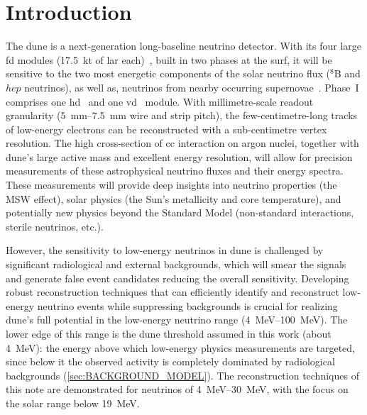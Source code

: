 \section{Introduction} \label{sec:INTRODUCTION}
The \gls{dune} is a next-generation long-baseline neutrino detector. With its four large \gls{fd} modules (\SI{17.5}{\kilo\tonne} of \gls{lar} each)~\cite{abi2018dune,DUNE:2020lwj}, built in two phases at the \gls{surf}, it will be sensitive to the two most energetic components of the solar neutrino flux ($^{8}\text{B}$ and $hep$ neutrinos), as well as, neutrinos from nearby occurring supernovae~\cite{DUNE:2020zfm}. Phase~I comprises one \gls{hd}~\cite{DUNE:2020txw} and one \gls{vd}~\cite{DUNE:2023nqi} module. With millimetre-scale readout granularity (\SIrange{5}{7.5}{\milli\meter} wire and strip pitch), the few-centimetre-long tracks of low-energy electrons can be reconstructed with a sub-centimetre vertex resolution. The high cross-section of \gls{cc} interaction on argon nuclei, together with \gls{dune}'s large active mass and excellent energy resolution, will allow for precision measurements of these astrophysical neutrino fluxes and their energy spectra. These measurements will provide deep insights into neutrino properties (the MSW effect), solar physics (the Sun's metallicity and core temperature), and potentially new physics beyond the Standard Model (non-standard interactions, sterile neutrinos, etc.).

However, the sensitivity to low-energy neutrinos in \gls{dune} is challenged by significant radiological and external backgrounds, which will smear the signals and generate false event candidates reducing the overall sensitivity. Developing robust reconstruction techniques that can efficiently identify and reconstruct low-energy neutrino events while suppressing backgrounds is crucial for realizing \gls{dune}'s full potential in the low-energy neutrino range (\qtyrange{4}{100}{\mega\electronvolt}). The lower edge of this range is the \gls{dune} threshold assumed in this work (about \SI{4}{\mega\electronvolt}): the energy above which low-energy physics measurements are targeted, since below it the observed activity is completely dominated by radiological backgrounds (\cref{sec:BACKGROUND_MODEL}). The reconstruction techniques of this note are demonstrated for neutrinos of \qtyrange{4}{30}{\mega\electronvolt}, with the focus on the solar range below \SI{19}{\mega\electronvolt}.

